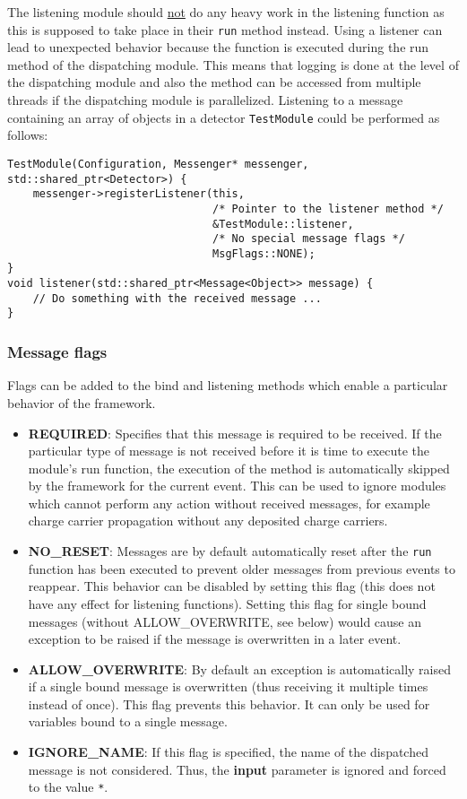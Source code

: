\begin{enumerate}
The listening module should \underline{not} do any heavy work in the listening function as this is supposed to take place in their \texttt{run} method instead.
Using a listener can lead to unexpected behavior because the function is executed during the run method of the dispatching module. 
This means that logging is done at the level of the dispatching module and also the method can be accessed from multiple threads if the dispatching module is parallelized.
Listening to a message containing an array of objects in a detector \texttt{TestModule} could be performed as follows:
\begin{verbatim}
TestModule(Configuration, Messenger* messenger, std::shared_ptr<Detector>) {
    messenger->registerListener(this,
                                /* Pointer to the listener method */
                                &TestModule::listener,
                                /* No special message flags */
                                MsgFlags::NONE);
}
void listener(std::shared_ptr<Message<Object>> message) {
    // Do something with the received message ...
}
\end{verbatim}
\end{enumerate}

\subsubsection{Message flags}
Flags can be added to the bind and listening methods which enable a particular behavior of the framework.
\begin{itemize}
\item \textbf{REQUIRED}: Specifies that this message is required to be received.
If the particular type of message is not received before it is time to execute the module's run function, the execution of the method is automatically skipped by the framework for the current event.
This can be used to ignore modules which cannot perform any action without received messages, for example charge carrier propagation without any deposited charge carriers.
\item \textbf{NO\_RESET}: Messages are by default automatically reset after the \texttt{run} function has been executed to prevent older messages from previous events to reappear.
This behavior can be disabled by setting this flag (this does not have any effect for listening functions).
Setting this flag for single bound messages (without ALLOW\_OVERWRITE, see below) would cause an exception to be raised if the message is overwritten in a later event.
\item \textbf{ALLOW\_OVERWRITE}: By default an exception is automatically raised if a single bound message is overwritten (thus receiving it multiple times instead of once).
This flag prevents this behavior.
It can only be used for variables bound to a single message.
\item \textbf{IGNORE\_NAME}: If this flag is specified, the name of the dispatched message is not considered.
Thus, the \textbf{input} parameter is ignored and forced to the value \texttt{*}.
\end{itemize}

